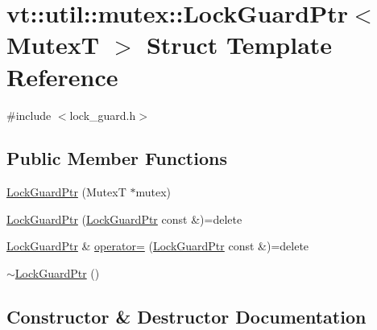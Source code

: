 \hypertarget{structvt_1_1util_1_1mutex_1_1_lock_guard_ptr}{}\section{vt\+:\+:util\+:\+:mutex\+:\+:Lock\+Guard\+Ptr$<$ MutexT $>$ Struct Template Reference}
\label{structvt_1_1util_1_1mutex_1_1_lock_guard_ptr}


{\ttfamily \#include $<$lock\+\_\+guard.\+h$>$}

\subsection*{Public Member Functions}
\begin{DoxyCompactItemize}
\item 
\hyperlink{structvt_1_1util_1_1mutex_1_1_lock_guard_ptr_ae8e65d8b2e5f55621aa91b87da7a0ecb}{Lock\+Guard\+Ptr} (MutexT $\ast$mutex)
\item 
\hyperlink{structvt_1_1util_1_1mutex_1_1_lock_guard_ptr_af12e24d099e69a582ceabd7cd4f77079}{Lock\+Guard\+Ptr} (\hyperlink{structvt_1_1util_1_1mutex_1_1_lock_guard_ptr}{Lock\+Guard\+Ptr} const \&)=delete
\item 
\hyperlink{structvt_1_1util_1_1mutex_1_1_lock_guard_ptr}{Lock\+Guard\+Ptr} \& \hyperlink{structvt_1_1util_1_1mutex_1_1_lock_guard_ptr_a17f01073ff7844fc0215758035ff74fb}{operator=} (\hyperlink{structvt_1_1util_1_1mutex_1_1_lock_guard_ptr}{Lock\+Guard\+Ptr} const \&)=delete
\item 
\hyperlink{structvt_1_1util_1_1mutex_1_1_lock_guard_ptr_af4304427f4783fc57e3fb889d4e64797}{$\sim$\+Lock\+Guard\+Ptr} ()
\end{DoxyCompactItemize}


\subsection{Constructor \& Destructor Documentation}
\mbox{\label{structvt_1_1util_1_1mutex_1_1_lock_guard_ptr_ae8e65d8b2e5f55621aa91b87da7a0ecb}} 
